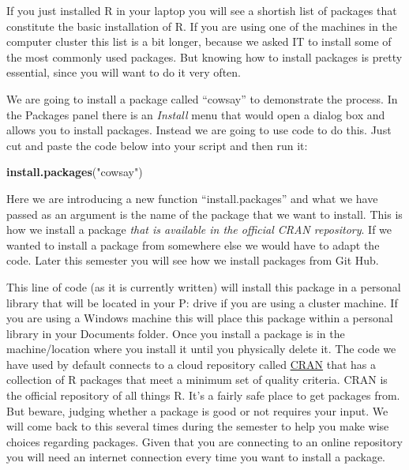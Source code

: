 \documentclass[]{book}
\newenvironment{Shaded}{\begin{snugshade}}{\end{snugshade}}
\newcommand{\KeywordTok}[1]{\textcolor[rgb]{0.13,0.29,0.53}{\textbf{#1}}}
\newcommand{\NormalTok}[1]{#1}
\newcommand{\StringTok}[1]{\textcolor[rgb]{0.31,0.60,0.02}{#1}}
\begin{document}
If you just installed R in your laptop you will see a shortish list of packages that constitute the basic installation of R. If you are using one of the machines in the computer cluster this list is a bit longer, because we asked IT to install some of the most commonly used packages. But knowing how to install packages is pretty essential, since you will want to do it very often.

We are going to install a package called ``cowsay'' to demonstrate the process. In the Packages panel there is an \emph{Install} menu that would open a dialog box and allows you to install packages. Instead we are going to use code to do this. Just cut and paste the code below into your script and then run it:

\begin{Shaded}
\begin{Highlighting}[]
\KeywordTok{install.packages}\NormalTok{(}\StringTok{"cowsay"}\NormalTok{)}
\end{Highlighting}
\end{Shaded}

Here we are introducing a new function ``install.packages'' and what we have passed as an argument is the name of the package that we want to install. This is how we install a package \emph{that is available in the official CRAN repository}. If we wanted to install a package from somewhere else we would have to adapt the code. Later this semester you will see how we install packages from Git Hub.

This line of code (as it is currently written) will install this package in a personal library that will be located in your P: drive if you are using a cluster machine. If you are using a Windows machine this will place this package within a personal library in your Documents folder. Once you install a package is in the machine/location where you install it until you physically delete it.
The code we have used by default connects to a cloud repository called \href{https://cran.r-project.org/}{CRAN} that has a collection of R packages that meet a minimum set of quality criteria. CRAN is the official repository of all things R. It's a fairly safe place to get packages from. But beware, judging whether a package is good or not requires your input. We will come back to this several times during the semester to help you make wise choices regarding packages. Given that you are connecting to an online repository you will need an internet connection every time you want to install a package.
\end{document}
